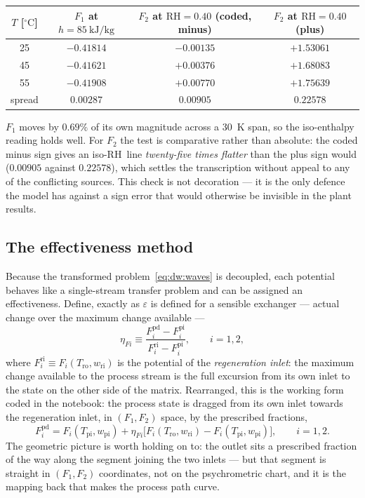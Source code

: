 \documentclass[11pt]{article}
\newcommand{\RH}{\ensuremath{\mathrm{RH}}}
\newcommand{\degC}{\ensuremath{^{\circ}\mathrm{C}}}
\begin{document}
\begin{center}
\begin{tabular}{@{}cccc@{}}
\toprule
$T$ [\degC] & $F_1$ at $h=\SI{85}{\kilo\joule\per\kilogram}$
            & $F_2$ at $\RH=0.40$ (coded, minus)
            & $F_2$ at $\RH=0.40$ (plus) \\
\midrule
25 & $-0.41814$ & $-0.00135$ & $+1.53061$ \\
45 & $-0.41621$ & $+0.00376$ & $+1.68083$ \\
55 & $-0.41908$ & $+0.00770$ & $+1.75639$ \\
\midrule
spread & $0.00287$ & $0.00905$ & $0.22578$ \\
\bottomrule
\end{tabular}
\label{tab:dw:selfcheck}
\end{center}

$F_1$ moves by $0.69\%$ of its own magnitude across a \SI{30}{\kelvin} span,
so the iso-enthalpy reading holds well. For $F_2$ the test is comparative
rather than absolute: the coded minus sign gives an iso-\RH\ line
\emph{twenty-five times flatter} than the plus sign would
($0.00905$ against $0.22578$), which settles the transcription without appeal
to any of the conflicting sources. This check is not decoration --- it is the
only defence the model has against a sign error that would otherwise be
invisible in the plant results.

\subsection{The effectiveness method}
\label{sec:dw:effectiveness}

Because the transformed problem~\eqref{eq:dw:waves} is decoupled, each
potential behaves like a single-stream transfer problem and can be assigned an
effectiveness. Define, exactly as $\varepsilon$ is defined for a sensible
exchanger --- actual change over the maximum change available ---
\begin{equation}
\eta_{Fi} \equiv
\frac{F_i^{\mathrm{pd}}-F_i^{\mathrm{pi}}}
     {F_i^{\mathrm{ri}}-F_i^{\mathrm{pi}}},
\qquad i=1,2,
\label{eq:dw:etadef}
\end{equation}
where $F_i^{\mathrm{ri}} \equiv F_i(T_{\mathrm{ro}},w_{\mathrm{ri}})$ is the
potential of the \emph{regeneration inlet}: the maximum change available to
the process stream is the full excursion from its own inlet to the state on
the other side of the matrix. Rearranged, this is the working form
coded in the notebook: the process state is dragged from its own inlet
towards the regeneration inlet, in $(F_1,F_2)$ space, by the prescribed
fractions,
\begin{equation}
\boxed{\;
F_i^{\mathrm{pd}} = F_i(T_{\mathrm{pi}},w_{\mathrm{pi}})
+\eta_{Fi}\Big[F_i(T_{\mathrm{ro}},w_{\mathrm{ri}})
-F_i(T_{\mathrm{pi}},w_{\mathrm{pi}})\Big],
\qquad i=1,2 .
\;}
\label{eq:dw:drag}
\end{equation}
The geometric picture is worth holding on to: the outlet sits a prescribed
fraction of the way along the segment joining the two inlets --- but that
segment is straight in $(F_1,F_2)$ coordinates, not on the psychrometric
chart, and it is the mapping back that makes the process path curve.
\end{document}
